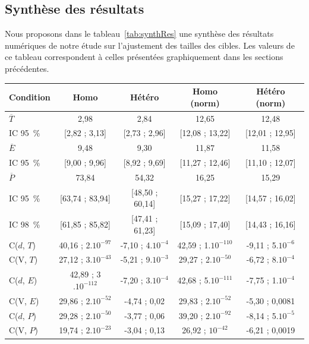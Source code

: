 	\subsection{Synthèse des résultats}
	Nous proposons dans le tableau~\ref{tab:synthRes} une synthèse des résultats numériques de notre étude sur l'ajustement des tailles des cibles. Les valeurs de ce tableau correspondent à celles présentées graphiquement dans les sections précédentes.
	
\begin{table}
	\centering
	\begin{tabular}{l | c c c c}
		Condition		& Homo						& Hétéro					& Homo (norm)				& Hétéro (norm)				\bigstrut[b] \\ \hline
		$\overline{T}$	& 2,98						& 2,84						& 12,65						& 12,48						\bigstrut[t] \\
		IC 95~\%{}		& [2,82 ; 3,13]				& [2,73 ; 2,96]				& [12,08 ; 13,22]			& [12,01 ; 12,95]			\bigstrut[b] \\ \hline
		$\overline{E}$	& 9,48						& 9,30						& 11,87						& 11,58						\bigstrut[t] \\
		IC 95~\%{}		& [9,00 ; 9,96]				& [8,92 ; 9,69]				& [11,27 ; 12,46]			& [11,10 ; 12,07]			\bigstrut[b] \\ \hline
		$\overline{P}$	& 73,84						& 54,32						& 16,25						& 15,29						\bigstrut[t] \\
		IC 95~\%{}		& [63,74 ; 83,94]			& [48,50 ; 60,14]			& [15,27 ; 17,22]			& [14,57 ; 16,02]			\\
		IC 98~\%{}		& [61,85 ; 85,82]			& [47,41 ; 61,23]			& [15,09 ; 17,40]			& [14,43 ; 16,16]			\bigstrut[b] \\ \hline
		C($d$, $T$)		& 40,16 ; 2$.10^{-97}$		& -7,10 ; 4$.10^{-4}$		& 42,59 ; 1$.10^{-110}$		& -9,11 ; 5$.10^{-6}$		\bigstrut[t] \\
		C(V, $T$)		& 27,12 ; 3$.10^{-43}$		& -5,21 ; 9$.10^{-3}$		& 29,27 ; 2$.10^{-50}$		& -6,72 ; 8$.10^{-4}$		\\
		C($d$, $E$)		& 42,89 ; 3$.10^{-112}$		& -7,20 ; 3$.10^{-4}$		& 42,68 ; 5$.10^{-111}$		& -7,75 ; 1$.10^{-4}$		\\
		C(V, $E$)		& 29,86 ; 2$.10^{-52}$		& -4,74 ; 0,02				& 29,83 ; 2$.10^{-52}$		& -5,30 ; 0,0081			\\
		C($d$, $P$)		& 29,28 ; 2$.10^{-50}$		& -3,77 ; 0,06				& 39,20 ; 2$.10^{-92}$		& -8,14 ; 5$.10^{-5}$		\\
		C(V, $P$)		& 19,74 ; 2$.10^{-23}$		& -3,04 ; 0,13				& 26,92 ; $10^{-42}$		& -6,21 ; 0,0019			\\

\end{tabular}
\end{table}
